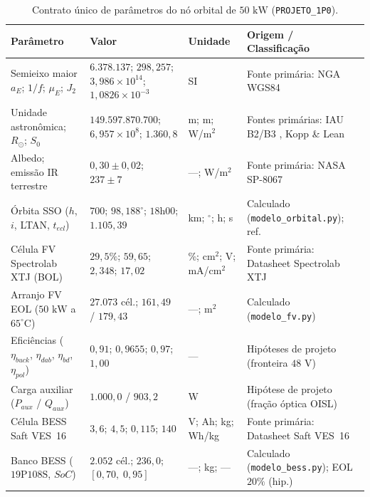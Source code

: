 \begin{table}[htbp]
\centering
\scriptsize
\setlength{\tabcolsep}{4pt}
\caption{Contrato único de parâmetros do nó orbital de $50\text{ kW}$ (\texttt{PROJETO\_1P0}).}
\label{tab:contrato_parametros}
\begin{tabularx}{\textwidth}{>{\raggedright\arraybackslash}p{3.5cm}>{\raggedright\arraybackslash}p{4.3cm}>{\raggedright\arraybackslash}p{1.6cm}>{\raggedright\arraybackslash}X}
\toprule
\textbf{Parâmetro} & \textbf{Valor} & \textbf{Unidade} & \textbf{Origem / Classificação} \\
\midrule
Semieixo maior $a_E$; $1/f$; $\mu_E$; $J_2$ & $6.378.137$; $298{,}257$; $3{,}986\times 10^{14}$; $1{,}0826\times 10^{-3}$ & SI & Fonte primária: NGA WGS84 \cite{nga2014wgs84} \\
Unidade astronômica; $R_\odot$; $S_0$ & $149.597.870.700$; $6{,}957\times 10^8$; $1.360{,}8$ & m; m; W/m$^2$ & Fontes primárias: IAU B2/B3 \cite{iau2012b2,iau2015b3}, Kopp \& Lean \cite{kopp2011tsi} \\
Albedo; emissão IR terrestre & $0{,}30 \pm 0{,}02$; $237 \pm 7$ & —; W/m$^2$ & Fonte primária: NASA SP-8067 \cite{nasa1971sp8067} \\
Órbita SSO ($h$, $i$, LTAN, $t_{ecl}$) & $700$; $98{,}188^\circ$; $18\text{h}00$; $1.105{,}39$ & km; $^\circ$; h; s & Calculado (\texttt{modelo\_orbital.py}); ref. \cite{nasa2018gdc} \\
Célula FV Spectrolab XTJ (BOL) & $29{,}5\%$; $59{,}65$; $2{,}348$; $17{,}02$ & \%; cm$^2$; V; mA/cm$^2$ & Fonte primária: Datasheet Spectrolab XTJ \cite{spectrolab_xtj_prime} \\
Arranjo FV EOL ($50\text{ kW}$ a $65^\circ\text{C}$) & $27.073$ cél.; $161{,}49$ / $179{,}43$ & —; m$^2$ & Calculado (\texttt{modelo\_fv.py}) \\
Eficiências ($\eta_{buck}$, $\eta_{dab}$, $\eta_{bd}$, $\eta_{pol}$) & $0{,}91$; $0{,}9655$; $0{,}97$; $1{,}00$ & — & Hipóteses de projeto (fronteira $48\text{ V}$) \\
Carga auxiliar ($P_{aux}$ / $Q_{aux}$) & $1.000{,}0$ / $903{,}2$ & W & Hipótese de projeto (fração óptica OISL) \\
Célula BESS Saft VES~16 & $3{,}6$; $4{,}5$; $0{,}115$; $140$ & V; Ah; kg; Wh/kg & Fonte primária: Datasheet Saft VES~16 \cite{saft_ves16} \\
Banco BESS ($19\text{P}108\text{S}$, $SoC$) & $2.052$ cél.; $236{,}0$; $[0{,}70,\; 0{,}95]$ & —; kg; — & Calculado (\texttt{modelo\_bess.py}); EOL $20\%$ (hip.) \\

\end{tabularx}
\end{table}
